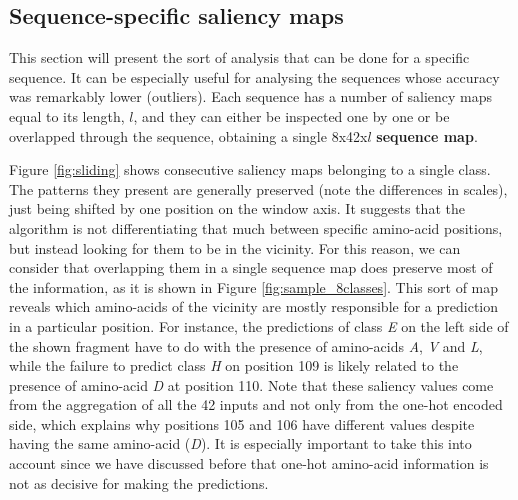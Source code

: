 
\subsection{Sequence-specific saliency maps}
This section will present the sort of analysis that can be done for a specific sequence. It can be especially useful for analysing the sequences whose accuracy was remarkably lower (outliers). Each sequence has a number of saliency maps equal to its length, $l$, and they can either be inspected one by one or be overlapped through the sequence, obtaining a single 8x42x$l$ \textbf{sequence map}.



Figure \ref{fig:sliding} shows consecutive saliency maps belonging to a single class. The patterns they present are generally preserved (note the differences in scales), just being shifted by one position on the window axis. It suggests that the algorithm is not differentiating that much between specific amino-acid positions, but instead looking for them to be in the vicinity. For this reason, we can consider that overlapping them in a single sequence map does preserve most of the information, as it is shown in Figure \ref{fig:sample_8classes}. This sort of map reveals which amino-acids of the vicinity are mostly responsible for a prediction in a particular position. For instance, the predictions of class \textit{E} on the left side of the shown fragment have to do with the presence of amino-acids \textit{A}, \textit{V} and \textit{L}, while the failure to predict class \textit{H} on position 109 is likely related to the presence of amino-acid \textit{D} at position 110. Note that these saliency values come from the aggregation of all the 42 inputs and not only from the one-hot encoded side, which explains why positions 105 and 106 have different values despite having the same amino-acid (\textit{D}). It is especially important to take this into account since we have discussed before that one-hot amino-acid information is not as decisive for making the predictions.

